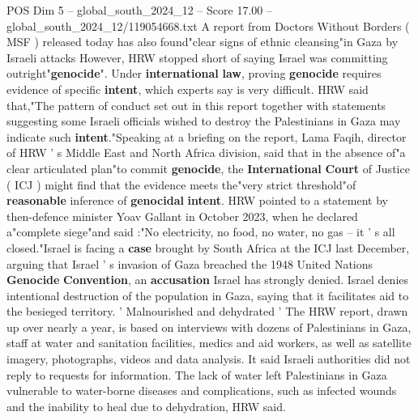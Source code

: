 \begin{textsample}{POS Dim 5 – global\_south\_2024\_12 – Score 17.00 – global\_south\_2024\_12/119054668.txt}
A report from Doctors Without Borders ( MSF ) released today has also found"clear signs of ethnic cleansing"in Gaza by Israeli attacks However, HRW stopped short of saying Israel was committing outright"\textbf{genocide}".
Under \textbf{international} \textbf{law}, proving \textbf{genocide} requires evidence of specific \textbf{intent}, which experts say is very difficult.
HRW said that,"The pattern of conduct set out in this report together with statements suggesting some Israeli officials wished to destroy the Palestinians in Gaza may indicate such \textbf{intent}."Speaking at a briefing on the report, Lama Faqih, director of HRW ' s Middle East and North Africa division, said that in the absence of"a clear articulated plan"to commit \textbf{genocide}, the \textbf{International} \textbf{Court} of Justice ( ICJ ) might find that the evidence meets the"very strict threshold"of \textbf{reasonable} inference of \textbf{genocidal} \textbf{intent}.
HRW pointed to a statement by then-defence minister Yoav Gallant in October 2023, when he declared a"complete siege"and said :"No electricity, no food, no water, no gas -- it ' s all closed."Israel is facing a \textbf{case} brought by South Africa at the ICJ last December, arguing that Israel ' s invasion of Gaza breached the 1948 United Nations \textbf{Genocide} \textbf{Convention}, an \textbf{accusation} Israel has strongly denied.
Israel denies intentional destruction of the population in Gaza, saying that it facilitates aid to the besieged territory. ' Malnourished and dehydrated ' The HRW report, drawn up over nearly a year, is based on interviews with dozens of Palestinians in Gaza, staff at water and sanitation facilities, medics and aid workers, as well as satellite imagery, photographs, videos and data analysis.
It said Israeli authorities did not reply to requests for information.
The lack of water left Palestinians in Gaza vulnerable to water-borne diseases and complications, such as infected wounds and the inability to heal due to dehydration, HRW said.

\end{textsample}
